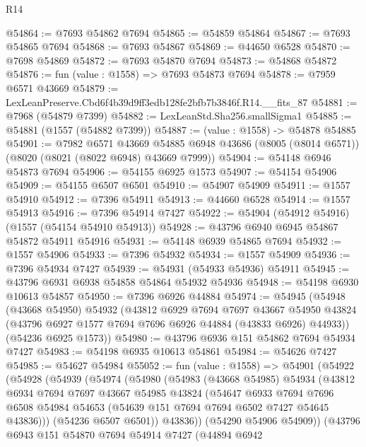\begin{lexlean}{R14}
\begin{coremodule}
@54864 := @7693 @54862 @7694
@54865 := @54859 @54864
@54867 := @7693 @54865 @7694
@54868 := @7693 @54867
@54869 := @44650 @6528
@54870 := @7698 @54869
@54872 := @7693 @54870 @7694
@54873 := @54868 @54872
@54876 := fun (value : @1558) => @7693 @54873 @7694
@54878 := @7959 @6571 @43669
@54879 := LexLeanPreserve.Cbd6f4b39d9ff3edb128fe2bfb7b3846f.R14.__fits_87
@54881 := @7968 (@54879 @7399)
@54882 := LexLeanStd.Sha256.smallSigma1
@54885 := @54881 (@1557 (@54882 @7399))
@54887 := (value : @1558) -> @54878 @54885
@54901 := @7982
    @6571
    @43669
    @54885
    @6948
    @43686
    (@8005 (@8014 @6571))
    (@8020 (@8021 (@8022 @6948) @43669 @7999))
@54904 := @54148 @6946 @54873 @7694
@54906 := @54155 @6925 @1573
@54907 := @54154 @54906
@54909 := @54155 @6507 @6501
@54910 := @54907 @54909
@54911 := @1557 @54910
@54912 := @7396 @54911
@54913 := @44660 @6528
@54914 := @1557 @54913
@54916 := @7396 @54914 @7427
@54922 := @54904 (@54912 @54916) (@1557 (@54154 @54910 @54913))
@54928 := @43796 @6940 @6945 @54867 @54872 @54911 @54916
@54931 := @54148 @6939 @54865 @7694
@54932 := @1557 @54906
@54933 := @7396 @54932
@54934 := @1557 @54909
@54936 := @7396 @54934 @7427
@54939 := @54931 (@54933 @54936) @54911
@54945 := @43796 @6931 @6938 @54858 @54864 @54932 @54936
@54948 := @54198 @6930 @10613 @54857
@54950 := @7396 @6926 @44884
@54974 := @54945
    (@54948
      (@43668 @54950)
      @54932
      (@43812
        @6929
        @7694
        @7697
        @43667
        @54950
        @43824
        (@43796 @6927 @1577 @7694 @7696 @6926 @44884 (@43833 @6926) @44933))
      (@54236 @6925 @1573))
@54980 := @43796 @6936 @151 @54862 @7694 @54934 @7427
@54983 := @54198 @6935 @10613 @54861
@54984 := @54626 @7427
@54985 := @54627 @54984
@55052 := fun (value : @1558) =>
  @54901
    (@54922
      (@54928
        (@54939
          (@54974
            (@54980
              (@54983
                (@43668 @54985)
                @54934
                (@43812
                  @6934
                  @7694
                  @7697
                  @43667
                  @54985
                  @43824
                  (@54647
                    @6933
                    @7694
                    @7696
                    @6508
                    @54984
                    @54653
                    (@54639 @151 @7694 @7694 @6502 @7427 @54645 @43836)))
                (@54236 @6507 @6501))
              @43836))
          (@54290 @54906 @54909))
        (@43796
          @6943
          @151
          @54870
          @7694
          @54914
          @7427
          (@44894
            @6942

\end{coremodule}
\end{lexlean}
